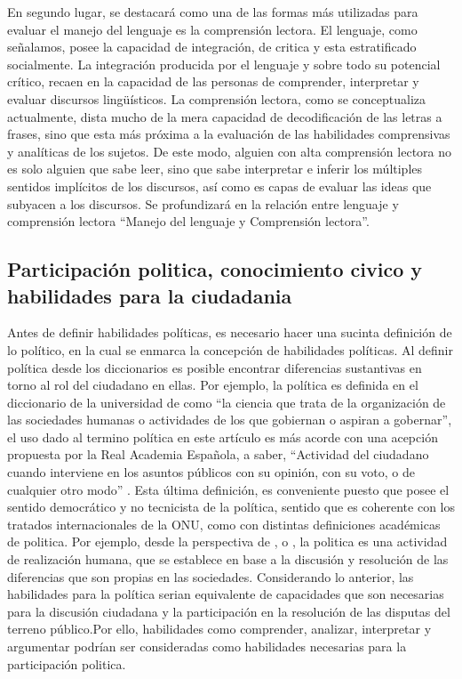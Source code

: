 \documentclass[12pt,twoside]{templates/facsothesis}
\begin{document}
En segundo lugar, se destacará como una de las formas más utilizadas para evaluar el manejo del lenguaje es la comprensión lectora. El lenguaje, como señalamos, posee la capacidad de integración, de critica y esta estratificado socialmente. La integración producida por el lenguaje y sobre todo su potencial crítico, recaen en la capacidad de las personas de comprender, interpretar y evaluar discursos lingüísticos. La comprensión lectora, como se conceptualiza actualmente, dista mucho de la mera capacidad de decodificación de las letras a frases, sino que esta más próxima a la evaluación de las habilidades comprensivas y analíticas de los sujetos. De este modo, alguien con alta comprensión lectora no es solo alguien que sabe leer, sino que sabe interpretar e inferir los múltiples sentidos implícitos de los discursos, así como es capas de evaluar las ideas que subyacen a los discursos. Se profundizará en la relación entre lenguaje y comprensión lectora ``Manejo del lenguaje y Comprensión lectora''.

\hypertarget{participaciuxf3n-politica-conocimiento-civico-y-habilidades-para-la-ciudadania}{%
\subsection{Participación politica, conocimiento civico y habilidades para la ciudadania}\label{participaciuxf3n-politica-conocimiento-civico-y-habilidades-para-la-ciudadania}}

Antes de definir habilidades políticas, es necesario hacer una sucinta definición de lo político, en la cual se enmarca la concepción de habilidades políticas. Al definir política desde los diccionarios es posible encontrar diferencias sustantivas en torno al rol del ciudadano en ellas. Por ejemplo, la política es definida en el diccionario de la universidad de \citet{oxford_Politica_2020} como ``la ciencia que trata de la organización de las sociedades humanas o actividades de los que gobiernan o aspiran a gobernar'', el uso dado al termino política en este artículo es más acorde con una acepción propuesta por la Real Academia Española, a saber, ``Actividad del ciudadano cuando interviene en los asuntos públicos con su opinión, con su voto, o de cualquier otro modo'' \citep{rae_politico_2014}. Esta última definición, es conveniente puesto que posee el sentido democrático y no tecnicista de la política, sentido que es coherente con los tratados internacionales de la ONU, como con distintas definiciones académicas de politica. Por ejemplo, desde la perspectiva de \citet{arendt_Que_2009}, \citet{lechner_conflictiva_1984} o \citet{mouffe_retorno_1999}, la politica es una actividad de realización humana, que se establece en base a la discusión y resolución de las diferencias que son propias en las sociedades. Considerando lo anterior, las habilidades para la política serian equivalente de capacidades que son necesarias para la discusión ciudadana y la participación en la resolución de las disputas del terreno público.Por ello, habilidades como comprender, analizar, interpretar y argumentar podrían ser consideradas como habilidades necesarias para la participación politica.
\end{document}
